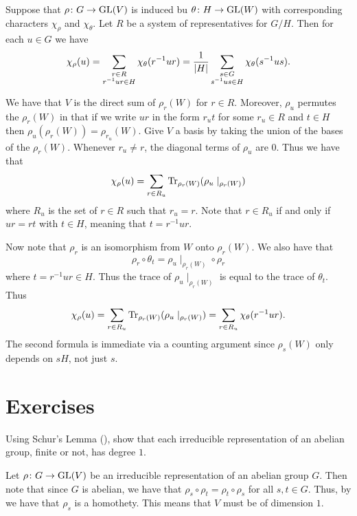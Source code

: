 \documentclass[letterpaper, 11pt, oneside]{book}
\begin{document}
\begin{thrm}\label{thrm:char_induced_rep}
  Suppose that $\rho\colon G \to \operatorname{GL}(V)$ is induced bu $\theta\colon H \to \operatorname{GL}(W)$ with corresponding characters $\chi_{\rho}$ and $\chi_{\theta}$.
  Let $R$ be a system of representatives for $G / H$.
  Then for each $u \in G$ we have
  \[
    \chi_{\rho}(u) = \sum_{\substack{r \in R \\ r^{-1}ur \in H}} \chi_{\theta}(r^{-1} u r) = \frac{1}{\abs{H}} \sum_{\substack{s \in G \\ s^{-1}us \in H}} \chi_{\theta}(s^{-1} u s).
  \]
\end{thrm}
\begin{pf}
  We have that $V$ is the direct sum of $\rho_{r}(W)$ for $r \in R$.
  Moreover, $\rho_{u}$ permutes the $\rho_{r}(W)$ in that if we write $ur$ in the form $r_{u} t$ for some $r_{u} \in R$ and $t \in H$ then $\rho_{u}(\rho_{r}(W)) = \rho_{r_{u}}(W)$.
  Give $V$ a basis by taking the union of the bases of the $\rho_{r}(W)$.
  Whenever $r_{u} \neq r$, the diagonal terms of $\rho_{u}$ are $0$.
  Thus we have that
  \[
    \chi_{\rho}(u) = \sum_{r \in R_{u}} \Tr_{\rho_{r}(W)}(\rho_{u}\mid_{\rho_{r}(W)})
  \]
  where $R_{u}$ is the set of $r \in R$ such that $r_{u} = r$.
  Note that $r \in R_{u}$ if and only if $ur = rt$ with $t \in H$, meaning that $t = r^{-1} u r$.

  Now note that $\rho_{r}$ is an isomorphism from $W$ onto $\rho_{r}(W)$.
  We also have that
  \[
    \rho_{r} \circ \theta_{t} = \rho_{u}\mid_{\rho_{r}(W)} \circ \rho_{r}
  \]
  where $t = r^{-1} u r \in H$.
  Thus the trace of $\rho_{u}\mid_{\rho_{r}(W)}$ is equal to the trace of $\theta_{t}$.
  Thus
  \[
    \chi_{\rho}(u) = \sum_{r \in R_{u}} \Tr_{\rho_{r}(W)}(\rho_{u}\mid_{\rho_{r}(W)}) = \sum_{r \in R_{u}} \chi_{\theta}(r^{-1} u r).
  \]
  The second formula is immediate via a counting argument since $\rho_{s}(W)$ only depends on $sH$, not just $s$.
\end{pf}

\clearpage

\section*{Exercises}

\begin{exercise}
  Using Schur's Lemma (), show that each irreducible representation of an abelian group, finite or not, has degree $1$.
\end{exercise}
\begin{pf}
  Let $\rho\colon G \to \operatorname{GL}(V)$ be an irreducible representation of an abelian group $G$.
  Then note that since $G$ is abelian, we have that $\rho_{s} \circ \rho_{t} = \rho_{t} \circ \rho_{s}$ for all $s, t \in G$.
  Thus, by  we have that $\rho_{s}$ is a homothety.
  This means that $V$ must be of dimension $1$.
\end{pf}
\end{document}
